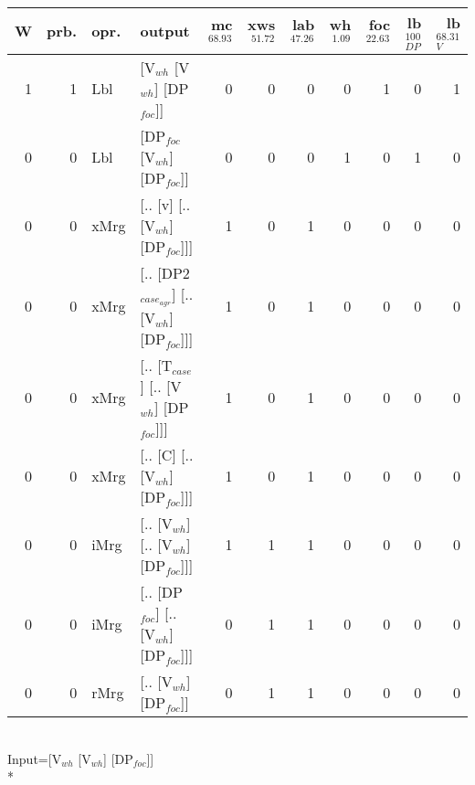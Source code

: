 \begin{tabularx}{\linewidth}{rrlXrrrrrrr}
\hline
   W &   prb. & opr.   & output                                   &   mc$^{68.93}$ &   xws$^{51.72}$ &   lab$^{47.26}$ &   wh$^{1.09}$ &   foc$^{22.63}$ &   lb$_{DP}^{100}$ &   lb$_{V}^{68.31}$ \\
\hline
   1 &   1 & Lbl  & [V$_{wh}$ [V$_{wh}$] [DP$_{foc}$]]                   &            0 &             0 &             0 &            0 &             1 &                0 &              1 \\
   0 &   0 & Lbl  & [DP$_{foc}$ [V$_{wh}$] [DP$_{foc}$]]                 &            0 &             0 &             0 &            1 &             0 &                1 &              0 \\
   0 &   0 & xMrg & [.. [v] [.. [V$_{wh}$] [DP$_{foc}$]]]            &            1 &             0 &             1 &            0 &             0 &                0 &              0 \\
   0 &   0 & xMrg & [.. [DP2$_{case_{agr}}$] [.. [V$_{wh}$] [DP$_{foc}$]]] &            1 &             0 &             1 &            0 &             0 &                0 &              0 \\
   0 &   0 & xMrg & [.. [T$_{case}$] [.. [V$_{wh}$] [DP$_{foc}$]]]       &            1 &             0 &             1 &            0 &             0 &                0 &              0 \\
   0 &   0 & xMrg & [.. [C] [.. [V$_{wh}$] [DP$_{foc}$]]]            &            1 &             0 &             1 &            0 &             0 &                0 &              0 \\
   0 &   0 & iMrg & [.. [V$_{wh}$] [.. [V$_{wh}$] [DP$_{foc}$]]]         &            1 &             1 &             1 &            0 &             0 &                0 &              0 \\
   0 &   0 & iMrg & [.. [DP$_{foc}$] [.. [V$_{wh}$] [DP$_{foc}$]]]       &            0 &             1 &             1 &            0 &             0 &                0 &              0 \\
   0 &   0 & rMrg & [.. [V$_{wh}$] [DP$_{foc}$]]                     &            0 &             1 &             1 &            0 &             0 &                0 &              0 \\
\hline
\end{tabularx}\endgroup\\
\begingroup\scriptsize Input=[V$_{wh}$ [V$_{wh}$] [DP$_{foc}$]]\\*
